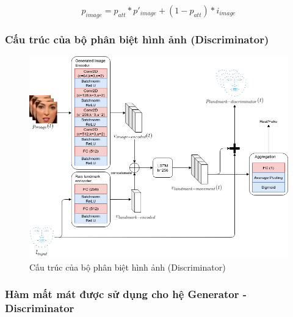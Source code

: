 \begin{equation}
    p_{image}=p_{att}*p'_{image}+(1-p_{att})*i_{image}
\end{equation}

\subsubsection{Cấu trúc của bộ phân biệt hình ảnh (Discriminator)}

\begin{figure}[H]
    \centering
    \includegraphics[width=15cm]{./content/materials/discriminator.png}
    \caption{Cấu trúc của bộ phân biệt hình ảnh (Discriminator)}
\end{figure}

\subsubsection{Hàm mất mát được sử dụng cho hệ Generator - Discriminator}
